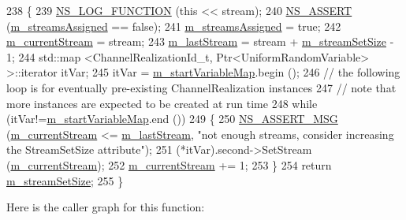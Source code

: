 \begin{DoxyCode}
238 \{
239   \hyperlink{log-macros-disabled_8h_a90b90d5bad1f39cb1b64923ea94c0761}{NS\_LOG\_FUNCTION} (\textcolor{keyword}{this} << stream);
240   \hyperlink{assert_8h_a6dccdb0de9b252f60088ce281c49d052}{NS\_ASSERT} (\hyperlink{classns3_1_1TraceFadingLossModel_a9f490e1d8426c9661d0bd6acdab01104}{m\_streamsAssigned} == \textcolor{keyword}{false});  
241   \hyperlink{classns3_1_1TraceFadingLossModel_a9f490e1d8426c9661d0bd6acdab01104}{m\_streamsAssigned} = \textcolor{keyword}{true};
242   \hyperlink{classns3_1_1TraceFadingLossModel_acbbf4b0443de173db3bd48e90581adde}{m\_currentStream} = stream;
243   \hyperlink{classns3_1_1TraceFadingLossModel_ad88d7e169a734f6b638d1ebf60f4b6fb}{m\_lastStream} = stream + \hyperlink{classns3_1_1TraceFadingLossModel_a0844a523ff1214fcba75f7368a9deebc}{m\_streamSetSize} - 1;
244   std::map <ChannelRealizationId\_t, Ptr<UniformRandomVariable> >::iterator itVar;
245   itVar = \hyperlink{classns3_1_1TraceFadingLossModel_a7e4e1717c089e89cb5de897687033354}{m\_startVariableMap}.begin ();
246   \textcolor{comment}{// the following loop is for eventually pre-existing ChannelRealization instances}
247   \textcolor{comment}{// note that more instances are expected to be created at run time}
248   \textcolor{keywordflow}{while} (itVar!=\hyperlink{classns3_1_1TraceFadingLossModel_a7e4e1717c089e89cb5de897687033354}{m\_startVariableMap}.end ())
249     \{
250       \hyperlink{assert_8h_aff5ece9066c74e681e74999856f08539}{NS\_ASSERT\_MSG} (\hyperlink{classns3_1_1TraceFadingLossModel_acbbf4b0443de173db3bd48e90581adde}{m\_currentStream} <= \hyperlink{classns3_1_1TraceFadingLossModel_ad88d7e169a734f6b638d1ebf60f4b6fb}{m\_lastStream}, \textcolor{stringliteral}{"not enough
       streams, consider increasing the StreamSetSize attribute"});
251       (*itVar).second->SetStream (\hyperlink{classns3_1_1TraceFadingLossModel_acbbf4b0443de173db3bd48e90581adde}{m\_currentStream});
252       \hyperlink{classns3_1_1TraceFadingLossModel_acbbf4b0443de173db3bd48e90581adde}{m\_currentStream} += 1;
253     \}
254   \textcolor{keywordflow}{return} \hyperlink{classns3_1_1TraceFadingLossModel_a0844a523ff1214fcba75f7368a9deebc}{m\_streamSetSize};
255 \}
\end{DoxyCode}


Here is the caller graph for this function\+:


